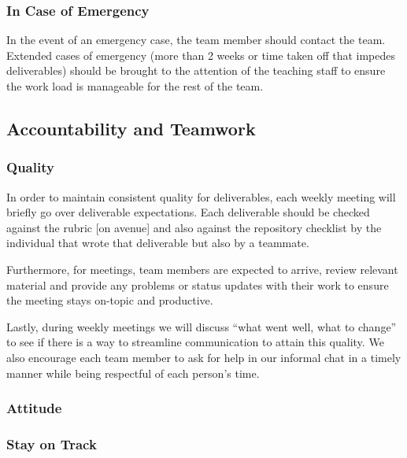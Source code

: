 \documentclass{article}
\begin{document}
\subsubsection*{In Case of Emergency}

In the event of an emergency case, the team member should contact the team. Extended cases of 
emergency (more than 2 weeks or time taken off that impedes deliverables) should be brought to 
the attention of the teaching staff to ensure the work load is manageable for the rest of the team.

\subsection*{Accountability and Teamwork}

\subsubsection*{Quality} 

In order to maintain consistent quality for deliverables, each weekly meeting will briefly go over 
deliverable expectations. Each deliverable should be checked against the rubric [on avenue] and also 
against the repository checklist by the individual that wrote that deliverable but also by a teammate. 


Furthermore, for meetings, team members are expected to arrive, review relevant material and provide 
any problems or status updates with their work to ensure the meeting stays on-topic and productive.

Lastly, during weekly meetings we will discuss “what went well, what to change” to see if there is a 
way to streamline communication to attain this quality. We also encourage each team member to ask for 
help in our informal chat in a timely manner while being respectful of each person's time.


\subsubsection*{Attitude}


\subsubsection*{Stay on Track}
\end{document}
